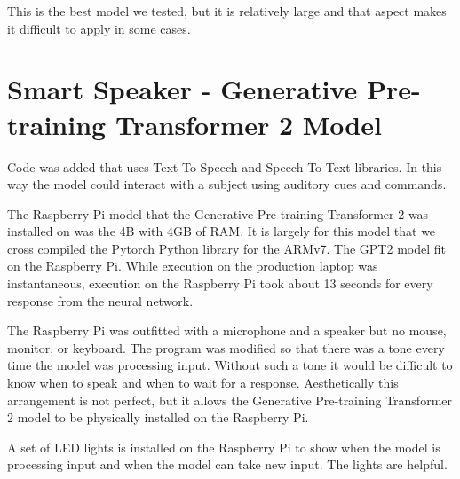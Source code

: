 This is the best model we tested, but it is relatively large and that aspect makes it difficult to apply in some cases.

\section{Smart Speaker - Generative Pre-training Transformer 2 Model}

Code was added that uses Text To Speech and Speech To Text libraries. In this way the model could interact with a subject using auditory cues and commands.

The Raspberry Pi model that the Generative Pre-training Transformer 2 was installed on was the 4B with 4GB of RAM. It is largely for this model that we cross compiled the Pytorch Python library for the ARMv7. The GPT2 model fit on the Raspberry Pi. While execution on the production laptop was instantaneous, execution on the Raspberry Pi took about 13 seconds for every response from the neural network.

The Raspberry Pi was outfitted with a microphone and a speaker but no mouse, monitor, or keyboard. The program was modified so that there was a tone every time the model was processing input. Without such a tone it would be difficult to know when to speak and when to wait for a response. Aesthetically this arrangement is not perfect, but it allows the Generative Pre-training Transformer 2 model to be physically installed on the Raspberry Pi.

A set of LED lights is installed on the Raspberry Pi to show when the model is processing input and when the model can take new input. The lights are helpful.
